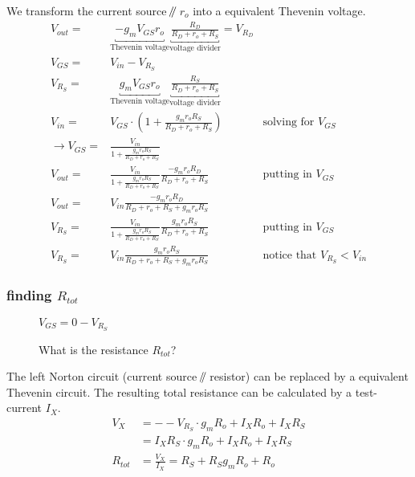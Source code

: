 \documentclass[11ypt]{extarticle}
\newcommand{\parallelEE}{\mathbin{\!/\mkern-5mu/\!}} %
\begin{document}
We transform the current source $\parallelEE$ $r_o$ into a equivalent Thevenin voltage.
\begin{equation}
\begin{aligned}
    V_{out} =& \underbracket{-g_m V_{GS} r_o}_\text{Thevenin voltage} \underbracket{\frac{R_D}{R_D+r_o+R_S}}_\text{voltage divider} = V_{R_D}
    \\
    V_{GS} =& V_{in} - V_{R_S} 
    \\
    V_{R_S} =& \underbracket{g_m V_{GS} r_o}_\text{Thevenin voltage} \underbracket{\frac{R_S}{R_D + r_o + R_S}}_\text{voltage divider}
    \\
    V_{in} =&  V_{GS}\cdot (1 + \frac{g_m r_o R_S}{R_D + r_o + R_S}) &\text{solving for $V_{GS}$}
    \\
    \rightarrow
    V_{GS} =& \frac{V_{in}}{1 +\frac{g_m r_o R_S}{R_D+r_o+R_S}}
    \\
    V_{out} =& \frac{V_{in}}{1 +\frac{g_m r_o R_S}{R_D+r_o+R_S}} \frac{-g_m r_o R_D}{R_D+r_o+R_S} &\text{putting in $V_{GS}$}
    \\
    V_{out} =& V_{in} \frac{-g_m r_o R_D}{R_D+r_o+R_S + g_m r_o R_S} 
    \\
    V_{R_S} =& \frac{V_{in}}{1 +\frac{g_m r_o R_S}{R_D+r_o+R_S}} \frac{g_m r_o R_{S}}{R_D+r_o+R_S} &\text{putting in $V_{GS}$}
    \\
    V_{R_S} =& V_{in} \frac{g_m r_o R_{S}}{R_D+r_o+R_S + g_m r_o R_S} &\text{notice that $V_{R_S} < V_{in}$}
\end{aligned}
\end{equation}

\subsubsection{finding $R_{tot}$}

\begin{figure}[H]{}
    \centering
	
\caption{What is the resistance $R_{tot}$?}
$V_{GS} = 0 - V_{R_S}$
\end{figure}

The left Norton circuit (current source $\parallelEE$ resistor) can be replaced by a equivalent Thevenin circuit. The resulting total resistance can be calculated by a test-current $I_X$.
\begin{equation}
\begin{aligned}
    V_X &= --V_{R_S} \cdot g_m R_{o} + I_X R_{o} + I_X R_S
    \\
    &=I_X R_S \cdot g_m R_{o} + I_X R_{o} + I_X R_S 
    \\
    R_{tot} &= \frac{V_X}{I_X} = R_S + R_S g_m R_{o} + R_{o}
\end{aligned}
\end{equation}
\end{document}
